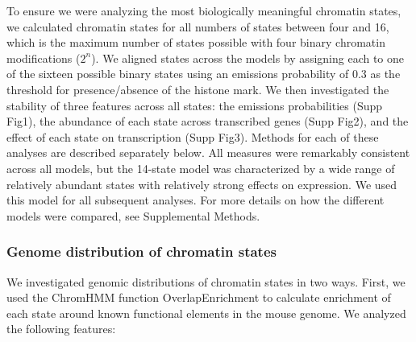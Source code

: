 \documentclass[10pt,letterpaper]{article}
\begin{document}
To ensure we were analyzing the most biologically meaningful chromatin
states, we calculated chromatin states for all numbers of states between
four and 16, which is the maximum number of states possible with four
binary chromatin modifications (\(2^n\)). We aligned states across the
models by assigning each to one of the sixteen possible binary states
using an emissions probability of 0.3 as the threshold for
presence/absence of the histone mark. We then investigated the stability
of three features across all states: the emissions probabilities (Supp
Fig1), the abundance of each state across transcribed genes (Supp Fig2),
and the effect of each state on transcription (Supp Fig3). Methods for
each of these analyses are described separately below. All measures were
remarkably consistent across all models, but the 14-state model was
characterized by a wide range of relatively abundant states with
relatively strong effects on expression. We used this model for all
subsequent analyses. For more details on how the different models were
compared, see Supplemental Methods.

\hypertarget{genome-distribution-of-chromatin-states}{%
\subsubsection{Genome distribution of chromatin
states}\label{genome-distribution-of-chromatin-states}}

We investigated genomic distributions of chromatin states in two ways.
First, we used the ChromHMM function OverlapEnrichment to calculate
enrichment of each state around known functional elements in the mouse
genome. We analyzed the following features:
\end{document}
